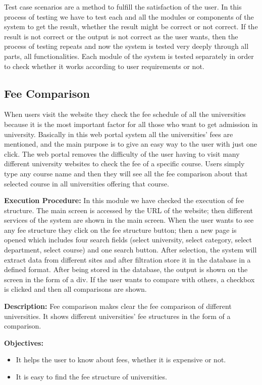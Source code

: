 Test case scenarios are a method to fulfill the satisfaction of the user. In this process of testing we have to test each and all the modules or components of the system to get the result, whether the result might be correct or not correct. If the result is not correct or the output is not correct as the user wants, then the process of testing repeats and now the system is tested very deeply through all parts, all functionalities. Each module of the system is tested separately in order to check whether it works according to user requirements or not.

\subsection{Fee Comparison}

When users visit the website they check the fee schedule of all the universities because it is the most important factor for all those who want to get admission in university. Basically in this web portal system all the universities' fees are mentioned, and the main purpose is to give an easy way to the user with just one click. The web portal removes the difficulty of the user having to visit many different university websites to check the fee of a specific course. Users simply type any course name and then they will see all the fee comparison about that selected course in all universities offering that course.

\textbf{Execution Procedure:}
In this module we have checked the execution of fee structure. The main screen is accessed by the URL of the website; then different services of the system are shown in the main screen. When the user wants to see any fee structure they click on the fee structure button; then a new page is opened which includes four search fields (select university, select category, select department, select course) and one search button. After selection, the system will extract data from different sites and after filtration store it in the database in a defined format. After being stored in the database, the output is shown on the screen in the form of a div. If the user wants to compare with others, a checkbox is clicked and then all comparisons are shown.

\textbf{Description:} Fee comparison makes clear the fee comparison of different universities. It shows different universities' fee structures in the form of a comparison.

\textbf{Objectives:}
\begin{itemize}
    \item It helps the user to know about fees, whether it is expensive or not.
    \item It is easy to find the fee structure of universities.
\end{itemize}

